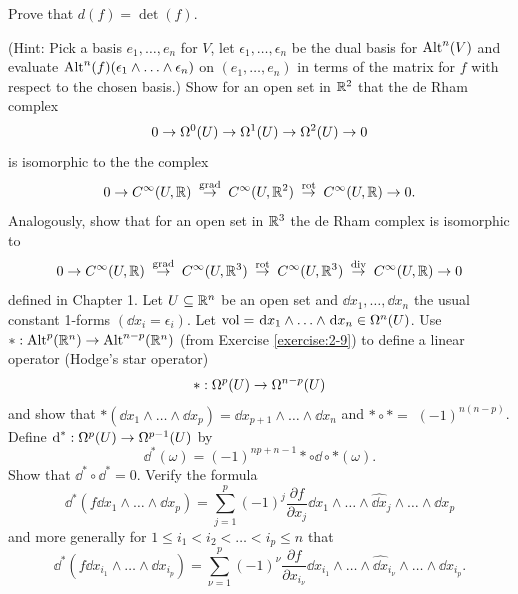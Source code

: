 \begin{enumerate}[label=\theexercise.\arabic*.,ref=\theexercise.\arabic*,leftmargin=2.7em]
    Prove that $d(f)  = \det ( f)$.
    \par(Hint: Pick a basis ${e}_{1},\ldots,{e}_{n}$ for $V$, let ${\epsilon }_{1},\ldots,{\epsilon }_{n}$ be the dual
    basis for ${\operatorname{Alt}}^{n}( V)$ and evaluate ${\operatorname{Alt}}^{n}( f) ( {{\epsilon }_{1} \land  \ldots  \land  {\epsilon }_{n}})$
    on $( {{e}_{1},\ldots,{e}_{n}})$ in terms of the matrix for $f$ with respect to the chosen basis.)
  \newchap[3]
  \NewItem Show for an open set in ${\mathbb{R}}^{2}$ that the de Rham complex
    \[
      0 \rightarrow  {\Omega }^{0}( U)  \rightarrow  {\Omega }^{1}( U)  \rightarrow  {\Omega }^{2}( U)  \rightarrow  0
    \]
    is isomorphic to the the complex
    \[
      0 \rightarrow  {C}^{\infty }( {U,\mathbb{R}}) \overset{\text{ grad }}{ \rightarrow  }{C}^{\infty }( {U,{\mathbb{R}}^{2}}) \overset{\text{ rot }}{ \rightarrow  }{C}^{\infty }( {U,\mathbb{R}})  \rightarrow  0.
    \]
    Analogously, show that for an open set in ${\mathbb{R}}^{3}$ the de Rham complex is isomorphic to
    \[
      0 \rightarrow  {C}^{\infty }( {U,{\mathbb{R}}})
      \overset{\text{ grad }}{ \rightarrow  }{C}^{\infty }( {U,{{\mathbb{R}}}^{3}})
      \overset{\text{ rot }}{ \rightarrow  }{C}^{\infty }( {U,{\mathbb{R}}^{3}})
      \overset{\text{ div }}{ \rightarrow  }{C}^{\infty }( {U,\mathbb{R}})  \rightarrow  0
    \]
    defined in Chapter 1.
  \NewItem Let $U \subseteq  {\ensuremath{\mathbb{R}}}^{n}$ be an open set and $\dd{x}_{1},\ldots,\dd{x}_{n}$ the usual constant 1-forms $( {\dd{x}_{i} = {\epsilon }_{i}})$. Let $\R{vol} = \dd{x}_{1} \land  \ldots  \land  \dd{x}_{n} \in  {\Omega }^{n}( U)$.
    Use $*  : {\operatorname{Alt}}^{p}( {{\mathbb{R}}}^{n})  \rightarrow  {\operatorname{Alt}}^{n- p}( {{\mathbb{R}}}^{n})$ (from Exercise \ref{exercise:2-9}) to define a linear operator (Hodge's star operator)
    \[
      *  : {\Omega }^{p}( U)  \rightarrow  {\Omega }^{n- p}( U)
    \]
    and show that $* ( {\dd{x}_{1} \land  \ldots  \land  \dd{x}_{p}})  = \dd{x}_{p + 1} \land  \ldots  \land  \dd{x}_{n}$ and $*  \circ   *  =$  ${(-1) }^{n( {n- p}) }$. Define ${\dd}^* : {\Omega }^{p}( U)  \ra  {\Omega }^{p- 1}( U)$ by
    \[
      {\dd}^*( \omega )  = {(-1) }^{{np} + n- 1} *  \circ  \dd \circ   * ( \omega ).
    \]
    Show that ${\dd}^* \circ  {\dd}^* = 0$.
    Verify the formula
    \[
      {\dd}^*( {f{\dd}{x}_{1} \land  \ldots  \land  \dd{x}_{p}})  = \sum_{{j = 1}}^{p}{(-1) }^{j}\frac{\partial f}{\partial {x}_{j}}\dd{x}_{1} \land  \ldots  \land  {\widehat{\dd x}}_{j} \land  \ldots  \land \dd{x}_{p}
    \]
    and more generally for $1 \leq  {i}_{1} < {i}_{2} < \ldots  < {i}_{p} \leq  n$ that
    \[
      {\dd}^*( {{f \dd}{x}_{{i}_{1}} \land  \ldots  \land  \dd{x}_{{i}_{p}}})  = \sum_{{\nu  = 1}}^{p}{(-1) }^{\nu }\frac{\partial f}{\partial {x}_{{i}_{\nu }}}\dd{x}_{{i}_{1}} \land  \ldots  \land  {\widehat{\dd x}}_{{i}_{\nu }} \land  \ldots  \land  \dd{x}_{{i}_{p}}.
\]
\end{enumerate}

